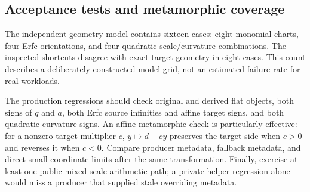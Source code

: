 \subsection{Acceptance tests and metamorphic coverage}

The independent geometry model contains sixteen cases: eight monomial charts, four Erfc orientations, and four quadratic scale/curvature combinations. The inspected shortcuts disagree with exact target geometry in eight cases. This count describes a deliberately constructed model grid, not an estimated failure rate for real workloads.

The production regressions should check original and derived flat objects, both signs of $q$ and $a$, both Erfc source infinities and affine target signs, and both quadratic curvature signs. An affine metamorphic check is particularly effective: for a nonzero target multiplier $c$, $y\mapsto d+cy$ preserves the target side when $c>0$ and reverses it when $c<0$. Compare producer metadata, fallback metadata, and direct small-coordinate limits after the same transformation. Finally, exercise at least one public mixed-scale arithmetic path; a private helper regression alone would miss a producer that supplied stale overriding metadata.
